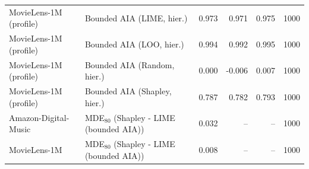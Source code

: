 \begin{table}[t]
\begin{tabular}{@{}llrrrr@{}}
MovieLens-1M (profile) & Bounded AIA (LIME, hier.) & 0.973 & 0.971 & 0.975 & 1000 \\
MovieLens-1M (profile) & Bounded AIA (LOO, hier.) & 0.994 & 0.992 & 0.995 & 1000 \\
MovieLens-1M (profile) & Bounded AIA (Random, hier.) & 0.000 & -0.006 & 0.007 & 1000 \\
MovieLens-1M (profile) & Bounded AIA (Shapley, hier.) & 0.787 & 0.782 & 0.793 & 1000 \\
Amazon-Digital-Music & MDE$_80$ (Shapley - LIME (bounded AIA)) & 0.032 & -- & -- & 1000 \\
MovieLens-1M & MDE$_80$ (Shapley - LIME (bounded AIA)) & 0.008 & -- & -- & 1000 \\
\bottomrule
\end{tabular}
\end{table}
